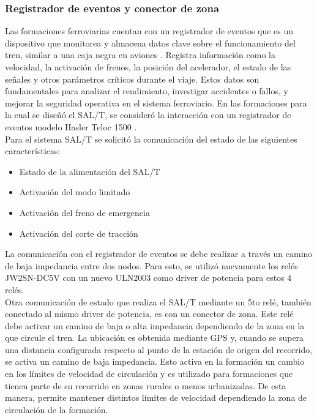 \subsubsection{Registrador de eventos y conector de zona}

Las formaciones ferroviarias cuentan con un registrador de eventos que es un dispositivo que monitorea y almacena datos clave sobre el funcionamiento del tren, similar a una caja negra en aviones \cite{registrador_eventos}. Registra información como la velocidad, la activación de frenos, la posición del acelerador, el estado de las señales y otros parámetros críticos durante el viaje. Estos datos son fundamentales para analizar el rendimiento, investigar accidentes o fallos, y mejorar la seguridad operativa en el sistema ferroviario. En las formaciones para la cual se diseñó el SAL/T, se consideró la interacción con un registrador de eventos modelo Hasler Teloc 1500 \cite{hasler}. \\ 

Para el sistema SAL/T se solicitó la comunicación del estado de las siguientes características: 

\begin{itemize}    
    \item Estado de la alimentación del SAL/T
    \item Activación del modo limitado
    \item Activación del freno de emergencia
    \item Activación del corte de tracción
\end{itemize}

La comunicación con el registrador de eventos se debe realizar a través un camino de baja impedancia entre dos nodos. Para esto, se utilizó nuevamente los relés JW2SN-DC5V con un nuevo ULN2003 como driver de potencia para estos 4 relés. \\

Otra comunicación de estado que realiza el SAL/T mediante un 5to relé, también conectado al mismo driver de potencia, es con un conector de zona. Este relé debe activar un camino de baja o alta impedancia dependiendo de la zona en la que circule el tren. La ubicación es obtenida mediante GPS y, cuando se supera una distancia configurada respecto al punto de la estación de origen del recorrido, se activa un camino de baja impedancia. Esto activa en la formación un cambio en los límites de velocidad de circulación y es utilizado para formaciones que tienen parte de su recorrido en zonas rurales o menos urbanizadas. De esta manera, permite mantener distintos límites de velocidad dependiendo la zona de circulación de la formación. 